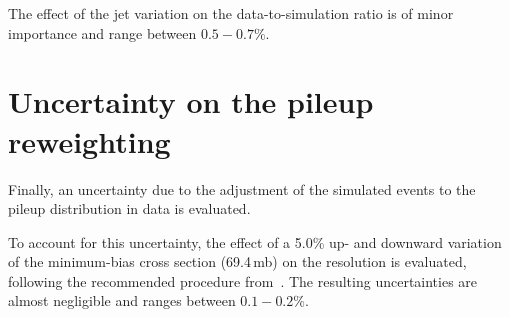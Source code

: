 The effect of the jet \pt variation on the data-to-simulation ratio is of minor importance and range between $0.5-0.7\%$.


\section*{Uncertainty on the pileup reweighting}
Finally, an uncertainty due to the adjustment of the simulated events to the pileup distribution in data is evaluated.

To account for this uncertainty, the effect of a 5.0\% up- and downward variation of the minimum-bias cross section (69.4\,mb) on the resolution is evaluated, following the recommended procedure from~\cite{bib:CMS:PileupSysUnc}.
The resulting uncertainties are almost negligible and ranges between $0.1-0.2\%$.

\FloatBarrier
